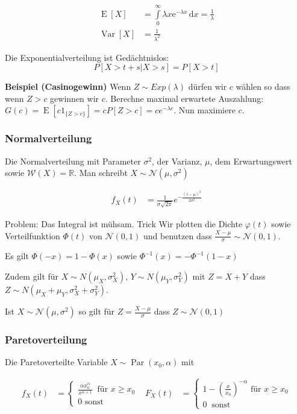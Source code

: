 \documentclass[25pt]{sciposter}
\newcommand{\R}{\mathbb{R}}
\newcommand{\W}{\mathcal{W}}
\newcommand{\Nor}{\mathcal{N}}
\newcommand{\Var}{\operatorname{Var}}
\newcommand{\E}{\operatorname{E}}
\begin{document}
\begin{multicols}{3}
		\begin{align*}
			\E[X]&=\int \limits _{0}^{\infty }\lambda x{\mathrm  {e}}^{{-\lambda x}}\,{\mathrm  {d}}x={\frac  {1}{\lambda }}\\
			\Var[X] &= \frac{1}{\lambda^2}
		\end{align*}
		
		Die Exponentialverteilung ist Gedächtnislos: 
		$$P[X > t+s| X > s] = P[X > t]$$
		
		\textbf{Beispiel (Casinogewinn)} Wenn $Z\sim Exp(\lambda)$ dürfen wir $c$ wählen so dass wenn $Z > c$ gewinnen wir $c$. Berechne maximal erwartete Auszahlung: $G(c) = \E[c1_{\{Z > c\}}] = cP[Z > c] = ce^{-\lambda c}$. Nun maximiere $c$.
		
		\subsubsection*{Normalverteilung}
		Die Normalverteilung mit Parameter $\sigma^2$, der Varianz, $\mu$, dem Erwartungswert sowie $\W(X) = \R$. Man schreibt $X\sim \Nor(\mu,\sigma^2)$
		
		\begin{align*}
			f_X(t) &= \frac{1}{\sigma\sqrt{2\pi}}e^{-\frac{(t-\mu)^2}{2\sigma^2}}
		\end{align*}
		
		Problem: Das Integral ist mühsam. Trick Wir plotten die Dichte $\varphi(t)$ sowie Verteilfunktion $\Phi(t)$ von $\Nor(0,1)$ und benutzen dass $\frac{X-\mu}{\sigma} \sim \Nor(0,1)$.
		\begin{mdframed}
			Es gilt $\Phi(-x) = 1 - \Phi(x)$ sowie ${\Phi^{-1}(x) = -\Phi^{-1}(1-x)}$
		\end{mdframed}
		
		
		Zudem gilt für $X\sim N(\mu_X,\sigma^2_X)$, $Y \sim N(\mu_Y, \sigma^2_Y)$ mit $Z=X+Y$ dass $Z \sim N(\mu_X+\mu_Y, \sigma^2_X + \sigma^2_Y)$.
		
		\begin{mdframed}
			Ist $X \sim \mathcal{N}(\mu,\sigma^2)$ so gilt für $Z={\frac  {X-\mu }{\sigma }}$ dass ${\displaystyle Z  \sim {\mathcal {N}}(0,1)}$
		\end{mdframed}
		
		
		\subsubsection*{Paretoverteilung}
		Die Paretoverteilte Variable $X\sim\operatorname{Par}(x_0,\alpha)$ mit 
		
		\begin{align*}
			f_X(t) &= \begin{cases}
				\frac{\alpha x_0 ^\alpha}{x^{\alpha+1}} \ \text{ für } x \geq x_0 \\
				0 \text{ sonst}
			\end{cases}
			& 
			F_X(t) &= \begin{cases}
				1-\left(\frac{x}{x_0}\right)^{-\alpha} \text{ für } x \geq x_0\\
				0 \ \text{ sonst}
			\end{cases}
		\end{align*}
		

\end{multicols}
\end{document}
